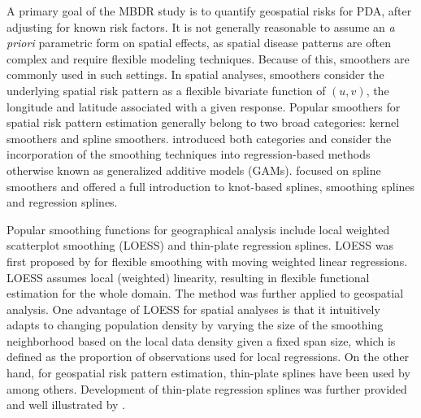 	A primary goal of the MBDR study is to quantify geospatial risks for PDA, after adjusting for known risk factors. It is not generally  reasonable to assume an \emph{a priori}  parametric form on spatial effects, as spatial disease patterns are often complex and require flexible modeling techniques. Because of this, smoothers are commonly used in such settings. In spatial analyses, smoothers consider the underlying spatial risk pattern as a flexible bivariate function of $(u,v)$, the longitude and latitude associated with a given response. Popular smoothers for spatial risk pattern estimation generally belong to two broad categories: kernel smoothers and spline smoothers. \cite{hastie1990generalized} introduced both categories and consider the incorporation of the smoothing techniques into regression-based methods otherwise known as generalized additive models (GAMs). \cite{wood2017generalized} focused on spline smoothers and offered a full introduction to knot-based splines, smoothing splines and regression splines.  %
	
	Popular smoothing functions for geographical analysis include local weighted scatterplot smoothing (LOESS) and thin-plate regression splines. LOESS was first proposed by \cite{cleveland1979robust} for flexible smoothing with moving weighted linear regressions. LOESS assumes local (weighted) linearity, resulting in flexible functional estimation for the whole domain. The method was further applied to geospatial analysis. \citep{brunsdon1996geographically} One advantage of LOESS for spatial analyses is that it intuitively adapts to changing population density by varying the size of the smoothing neighborhood based on the local data density given a fixed span size, which is defined as the proportion of observations used for local regressions. On the other hand, for geospatial risk pattern estimation, thin-plate splines have been used by \cite{duchon1977splines} among others. Development of thin-plate regression splines \citep{wood2003thin} was further provided and well illustrated by \cite{wood2017generalized}.
	
